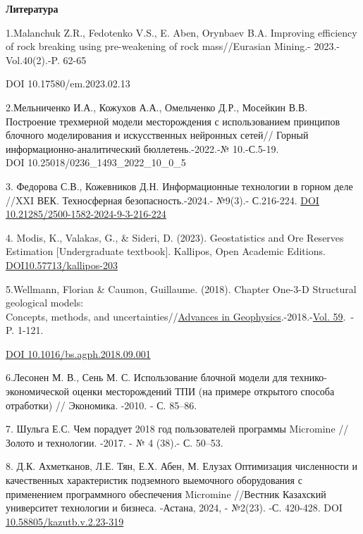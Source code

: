\begin{center}
{\bfseries Литература}
\end{center}
\begin{references}

1.Malanchuk Z.R., Fedotenko V.S., E. Aben, Orynbaev B.A. Improving
efficiency of rock breaking using pre-weakening of rock mass//Eurasian
Mining.- 2023.-Vol.40(2).-P. 62-65

DOI 10.17580/em.2023.02.13

2.Мельниченко И.А., Кожухов А.А., Омельченко Д.Р., Мосейкин В.В.
Построение трехмерной модели месторождения с использованием принципов
блочного моделирования и искусственных нейронных сетей// Горный
информационно-аналитический бюллетень.-2022.-№ 10.-С.5-19. \\DOI
10.25018/0236\_1493\_2022\_10\_0\_5

3. Федорова С.В., Кожевников Д.Н. Информационные технологии в горном
деле //XXI ВЕК. Техносферная безопасность.-2024.- №9(3).- С.216-224.
\href{http://dx.doi.org/10.21285/2500-1582-2024-9-3-216-224}{DOI
10.21285/2500-1582-2024-9-3-216-224}

4. Modis, K., Valakas, G., \& Sideri, D. (2023). Geostatistics and Ore
Reserves Estimation {[}Undergraduate textbook{]}. Kallipos, Open
Academic Editions.
\href{http://dx.doi.org/10.57713/kallipos-203}{DOI10.57713/kallipos-203}

5.Wellmann, Florian \& Caumon, Guillaume. (2018). Chapter One-3-D
Structural geological models: \\Concepts, methods, and uncertainties//\href{https://www.sciencedirect.com/bookseries/advances-in-geophysics}{Advances
in Geophysics}.-2018.-\href{https://www.sciencedirect.com/bookseries/advances-in-geophysics/vol/59/suppl/C}{Vol.
59}.~- P. 1-121. 

\href{http://dx.doi.org/10.1016/bs.agph.2018.09.001}{DOI
10.1016/bs.agph.2018.09.001} 

6.Лесонен М. В., Сень М. С. Использование блочной модели для
технико-экономической оценки месторождений ТПИ (на примере открытого
способа отработки) // Экономика. -2010. - С. 85--86.

7. Шульга Е.С. Чем порадует 2018 год пользователей программы Micromine
// Золото и технологии. -2017. - № 4 (38).- С. 50--53.

8. Д.К. Ахметканов, Л.Е. Тян, Е.Х. Абен, М. Елузах Оптимизация
численности и качественных характеристик подземного выемочного
оборудования с применением программного обеспечения Micromine //Вестник
Казахский университет технологии и бизнеса. -Астана, 2024, - №2(23). -С.
420-428. DOI \href{https://doi.org/10.58805/kazutb.v.2.23-319}{10.58805/kazutb.v.2.23-319}


\end{references}
